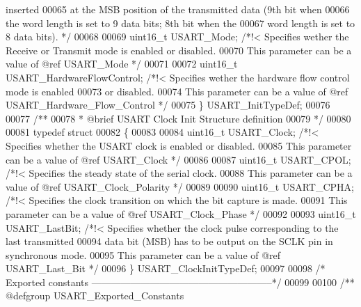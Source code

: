\begin{DoxyCode}
{       inserted}
00065 \textcolor{comment}{                                                 at the MSB position of the transmitted data (9th bit
       when}
00066 \textcolor{comment}{                                                 the word length is set to 9 data bits; 8th bit when
       the}
00067 \textcolor{comment}{                                                 word length is set to 8 data bits). */}
00068 
00069   uint16\_t USART_Mode;                \textcolor{comment}{/*!< Specifies wether the Receive or Transmit mode is enabled or
       disabled.}
00070 \textcolor{comment}{                                           This parameter can be a value of @ref USART\_Mode */}
00071 
00072   uint16\_t USART_HardwareFlowControl; \textcolor{comment}{/*!< Specifies wether the hardware flow control mode is enabled}
00073 \textcolor{comment}{                                           or disabled.}
00074 \textcolor{comment}{                                           This parameter can be a value of @ref
       USART\_Hardware\_Flow\_Control */}
00075 \} USART\_InitTypeDef;
00076 
00077 \textcolor{comment}{/** }
00078 \textcolor{comment}{  * @brief  USART Clock Init Structure definition  }
00079 \textcolor{comment}{  */}
00080 
00081 \textcolor{keyword}{typedef} \textcolor{keyword}{struct}
00082 \{
00083 
00084   uint16\_t USART_Clock;   \textcolor{comment}{/*!< Specifies whether the USART clock is enabled or disabled.}
00085 \textcolor{comment}{                               This parameter can be a value of @ref USART\_Clock */}
00086 
00087   uint16\_t USART_CPOL;    \textcolor{comment}{/*!< Specifies the steady state of the serial clock.}
00088 \textcolor{comment}{                               This parameter can be a value of @ref USART\_Clock\_Polarity */}
00089 
00090   uint16\_t USART_CPHA;    \textcolor{comment}{/*!< Specifies the clock transition on which the bit capture is made.}
00091 \textcolor{comment}{                               This parameter can be a value of @ref USART\_Clock\_Phase */}
00092 
00093   uint16\_t USART_LastBit; \textcolor{comment}{/*!< Specifies whether the clock pulse corresponding to the last transmitted}
00094 \textcolor{comment}{                               data bit (MSB) has to be output on the SCLK pin in synchronous mode.}
00095 \textcolor{comment}{                               This parameter can be a value of @ref USART\_Last\_Bit */}
00096 \} USART\_ClockInitTypeDef;
00097 
00098 \textcolor{comment}{/* Exported constants --------------------------------------------------------*/}
00099 
00100 \textcolor{comment}{/** @defgroup USART\_Exported\_Constants}

\end{DoxyCode}
